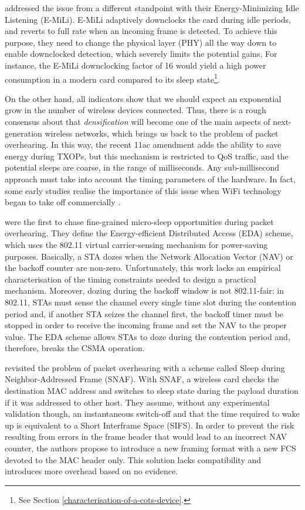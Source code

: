 \documentclass[twoside,nohyper]{tufte-book}
\theoremstyle{definition}
\theoremstyle{definition}
\theoremstyle{definition}
\theoremstyle{remark}
\begin{document}
\citet{Zhang2012} addressed the issue from a different standpoint with
their Energy-Minimizing Idle Listening (E-MiLi). E-MiLi adaptively
downclocks the card during idle periods, and reverts to full rate when
an incoming frame is detected. To achieve this purpose, they need to
change the physical layer (PHY) all the way down to enable downclocked
detection, which severely limits the potential gains. For instance, the
E-MiLi downclocking factor of 16 would yield a high power consumption in
a modern card compared to its sleep state\footnote{See Section
  \ref{characterisation-of-a-cots-device}.}.

On the other hand, all indicators show that we should expect an
exponential grow in the number of wireless devices connected. Thus,
there is a rough consensus about that \emph{densification} will become
one of the main aspects of next-generation wireless networks, which
brings us back to the problem of packet overhearing. In this way, the
recent 11ac amendment adds the ability to save energy during TXOPs, but
this mechanism is restricted to QoS traffic, and the potential sleeps
are coarse, in the range of milliseconds. Any sub-millisecond approach
must take into account the timing parameters of the hardware. In fact,
some early studies realise the importance of this issue when WiFi
technology began to take off commercially
\citep{kamerman1997, havinga2000, jung2002}.

\citet{Baiamonte2006} were the first to chase fine-grained micro-sleep
opportunities during packet overhearing. They define the
Energy-efficient Distributed Access (EDA) scheme, which uses the 802.11
virtual carrier-sensing mechanism for power-saving purposes. Basically,
a STA dozes when the Network Allocation Vector (NAV) or the backoff
counter are non-zero. Unfortunately, this work lacks an empirical
characterisation of the timing constraints needed to design a practical
mechanism. Moreover, dozing during the backoff window is not
802.11-fair: in 802.11, STAs must sense the channel every single time
slot during the contention period and, if another STA seizes the channel
first, the backoff timer must be stopped in order to receive the
incoming frame and set the NAV to the proper value. The EDA scheme
allows STAs to doze during the contention period and, therefore, breaks
the CSMA operation.

\citet{Balaji2010} revisited the problem of packet overhearing with a
scheme called Sleep during Neighbor-Addressed Frame (SNAF). With SNAF, a
wireless card checks the destination MAC address and switches to sleep
state during the payload duration if it was addressed to other host.
They assume, without any experimental validation though, an
instantaneous switch-off and that the time required to wake up is
equivalent to a Short Interframe Space (SIFS). In order to prevent the
risk resulting from errors in the frame header that would lead to an
incorrect NAV counter, the authors propose to introduce a new framing
format with a new FCS devoted to the MAC header only. This solution
lacks compatibility and introduces more overhead based on no evidence.
\end{document}
